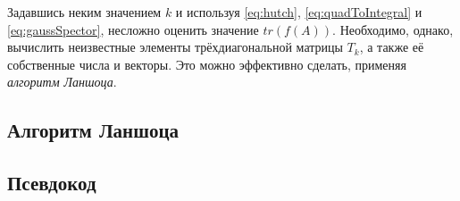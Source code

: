Задавшись неким значением $k$ и используя \eqref{eq:hutch}, \eqref{eq:quadToIntegral} и \eqref{eq:gaussSpector}, несложно оценить значение $ tr(f(A)) $.
Необходимо, однако, вычислить неизвестные элементы трёхдиагональной матрицы $ T_k $, а также её собственные числа и векторы.
Это можно эффективно сделать, применяя \emph{алгоритм Ланшоца}.

\subsection{Алгоритм Ланшоца}

\subsection{Псевдокод}

